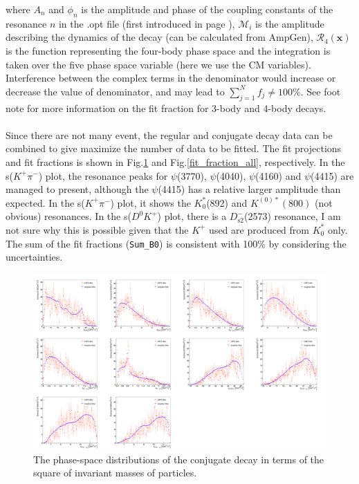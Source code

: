 where $A_n$ and $\phi_n$ is the amplitude and phase of the coupling constants of the resonance $n$ in the .opt file (first introduced in page \pageref{coupling_const}), $\mathcal{M}_i$ is the amplitude describing the dynamics of the decay (can be calculated from AmpGen), $\mathcal{R}_4(\bm{x})$ is the function representing the four-body phase space and the integration is taken over the five phase space variable (here we use the CM variables). Interference between the complex terms in the denominator would increase or decrease the value of denominator, and may lead to $\sum_{j=1}^N f_j \neq 100\%$. 
See foot note for more information on the fit fraction for 3-body \autocite{fitfrac_3b} and 4-body \autocite{Aaij_2019} decays.
\\
\\
Since there are not many event, the regular and conjugate decay data can be combined to give maximize the number of data to be fitted. The fit projections and fit fractions is shown in Fig.\ref{compare_all} and Fig.\ref{fit_fraction_all}, respectively. In the s($K^+\pi^-$) plot, the resonance peaks for $\psi$(3770), $\psi$(4040), $\psi$(4160) and $\psi$(4415) are managed to present, although the $\psi$(4415) has a relative larger amplitude than expected. In the s($K^+\pi^-$) plot, it shows the $K^*_0$(892) and $K^{(0)*}(800)$ (not obvious) resonances. In the s($D^0K^+$) plot, there is a $D_{\text{s2}}^-$(2573) resonance, I am not sure why this is possible given that the $K^+$ used are produced from $K^*_0$ only. The sum of the fit fractions (\texttt{Sum\_B0}) is consistent with 100\% by considering the uncertainties.
\begin{figure}[h]
\center
\includegraphics*[width=1.06\linewidth]{amplitude_fit/compare_all}
\caption{The phase-space distributions of the conjugate decay in terms of the square of invariant masses of particles.}
\label{compare_all}
\end{figure}
